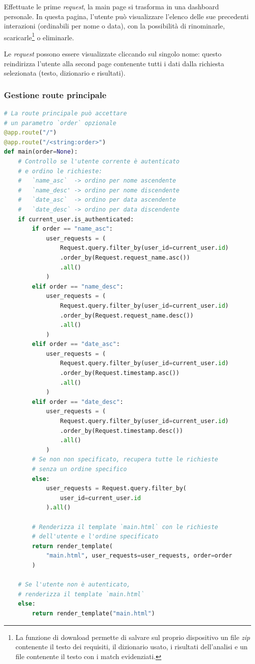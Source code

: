\documentclass[12pt]{report}
\begin{document}
Effettuate le prime \textit{request}, la \textsf{main page} si trasforma in una dashboard personale. In questa pagina, l'utente può visualizzare l'elenco delle sue precedenti interazioni (ordinabili per nome o data), con la possibilità di rinominarle, scaricarle\footnote{La funzione di download permette di salvare sul proprio dispositivo un file \textit{zip} contenente il testo dei requisiti, il dizionario usato, i risultati dell'analisi e un file contenente il testo con i match evidenziati.} o eliminarle.

Le \textit{request} possono essere visualizzate cliccando sul singolo nome: questo reindirizza l'utente alla \textsf{second page} contenente tutti i dati dalla richiesta selezionata (testo, dizionario e risultati).


\newpage
\subsubsection{Gestione route principale}
\begin{lstlisting}[language=Python]
# La route principale può accettare
# un parametro `order` opzionale
@app.route("/")
@app.route("/<string:order>")
def main(order=None):
    # Controllo se l'utente corrente è autenticato
    # e ordino le richieste:
    #   `name_asc`  -> ordino per nome ascendente
    #   `name_desc' -> ordino per nome discendente
    #   `date_asc`  -> ordino per data ascendente
    #   `date_desc` -> ordino per data discendente
    if current_user.is_authenticated:
        if order == "name_asc":
            user_requests = (
                Request.query.filter_by(user_id=current_user.id)
                .order_by(Request.request_name.asc())
                .all()
            )
        elif order == "name_desc":
            user_requests = (
                Request.query.filter_by(user_id=current_user.id)
                .order_by(Request.request_name.desc())
                .all()
            )
        elif order == "date_asc":
            user_requests = (
                Request.query.filter_by(user_id=current_user.id)
                .order_by(Request.timestamp.asc())
                .all()
            )
        elif order == "date_desc":
            user_requests = (
                Request.query.filter_by(user_id=current_user.id)
                .order_by(Request.timestamp.desc())
                .all()
            )
        # Se non non specificato, recupera tutte le richieste
        # senza un ordine specifico
        else:
            user_requests = Request.query.filter_by(
                user_id=current_user.id
            ).all()

        # Renderizza il template `main.html` con le richieste
        # dell'utente e l'ordine specificato
        return render_template(
            "main.html", user_requests=user_requests, order=order
        )

    # Se l'utente non è autenticato,
    # renderizza il template `main.html`
    else:
        return render_template("main.html")
\end{lstlisting}
\end{document}
